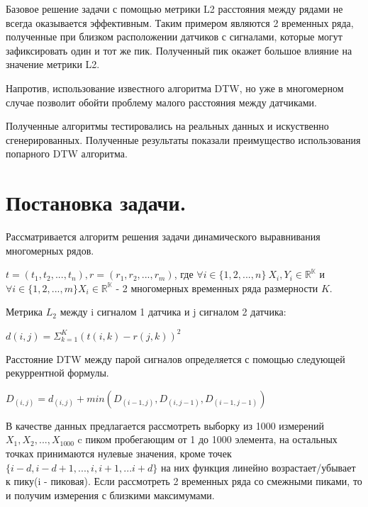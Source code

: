 \documentclass[12pt, twoside]{article}
\begin{document}
Базовое решение задачи с помощью метрики L2 расстояния между рядами не всегда оказывается эффективным. Таким примером являются 2 временных ряда, полученные при близком расположении датчиков с сигналами, которые могут зафиксировать один и тот же пик. Полученный пик окажет большое влияние на значение метрики L2.

Напротив, использование известного алгоритма DTW, но уже в многомерном случае позволит обойти проблему малого расстояния между датчиками.

Полученные алгоритмы тестировались на реальных данных и искуственно  сгенерированных. Полученные результаты показали преимущество использования попарного DTW алгоритма.


\section{Постановка задачи.}

Рассматривается алгоритм решения задачи динамического выравнивания многомерных рядов.

$t = (t_1, t_2, ..., t_n), r = (r_1, r_2, ..., r_m)$, где $\forall i \in \{1, 2, ..., n\}\  X_i, Y_i \in \mathbb{R^K}$ и $\forall i  \in \{1, 2, ..., m\}  X_i \in \mathbb{R^K}$ - 2 многомерных временных ряда размерности $K$.

Метрика $L_2$ между i сигналом 1 датчика и j сигналом 2 датчика: 

$d(i, j) = \Sigma_{k = 1}^K(t(i, k) - r(j, k))^2$

Расстояние DTW между парой сигналов определяется с помощью следующей рекуррентной формулы.

$D_{(i, j)} = d_{(i, j)} + min(D_{(i - 1, j)}, D_{(i, j - 1)}, D_{(i - 1, j - 1)})$

В качестве данных предлагается рассмотреть выборку из 1000 измерений $X_1, X_2, ..., X_1000$ c пиком пробегающим от 1 до 1000 элемента, на остальных 
точках принимаются нулевые значения, кроме точек $\{i - d, i - d + 1, ..., i, i + 1, ... i + d\}$ на них функция линейно возрастает/убывает к пику(i - пиковая). Если рассмотреть 2 временных ряда со смежными пиками, то и получим измерения с близкими максимумами.

 


\end{document}
